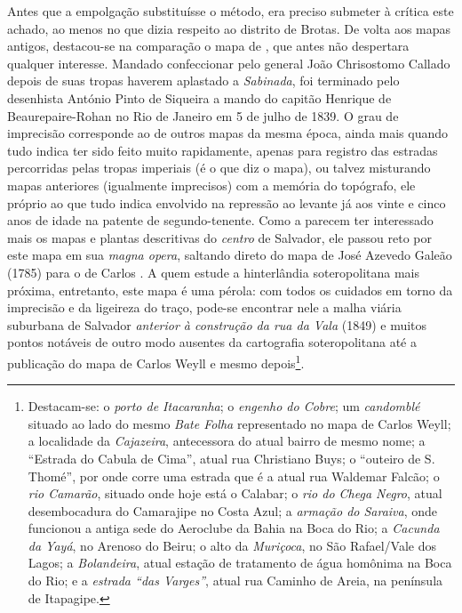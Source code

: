 Antes que a empolgação substituísse o método, era preciso submeter à crítica este achado, ao menos no que dizia respeito ao distrito de Brotas. De volta aos mapas antigos, destacou-se na comparação o mapa de , que antes não despertara qualquer interesse. Mandado confeccionar pelo general João Chrisostomo Callado depois de suas tropas haverem aplastado a \textit{Sabinada}, foi terminado pelo desenhista António Pinto de Siqueira a mando do capitão Henrique de Beaurepaire-Rohan no Rio de Janeiro em 5 de julho de 1839. O grau de imprecisão corresponde ao de outros mapas da mesma época, ainda mais quando tudo indica ter sido feito muito rapidamente, apenas para registro das estradas percorridas pelas tropas imperiais (é o que diz o mapa), ou talvez misturando mapas anteriores (igualmente imprecisos) com a memória do topógrafo, ele próprio ao que tudo indica envolvido na repressão ao levante já aos vinte e cinco anos de idade na patente de segundo-tenente. Como a  parecem ter interessado mais os mapas e plantas descritivas do \textit{centro} de Salvador, ele passou reto por este mapa em sua \textit{magna opera}, saltando direto do mapa de José Azevedo Galeão (1785) para o de Carlos . A quem estude a hinterlândia soteropolitana mais próxima, entretanto, este mapa é uma pérola: com todos os cuidados em torno da imprecisão e da ligeireza do traço, pode-se encontrar nele a malha viária suburbana de Salvador \textit{anterior à construção da rua da Vala} (1849) e muitos pontos notáveis de outro modo ausentes da cartografia soteropolitana até a publicação do mapa de Carlos Weyll e mesmo depois\footnote{Destacam-se: o \textit{porto de Itacaranha}; o \textit{engenho do Cobre}; um \textit{candomblé} situado ao lado do mesmo \textit{Bate Folha} representado no mapa de Carlos Weyll; a localidade da \textit{Cajazeira}, antecessora do atual bairro de mesmo nome; a ``Estrada do Cabula de Cima'', atual rua Christiano Buys; o ``outeiro de S. Thomé'', por onde corre uma estrada que é a atual rua Waldemar Falcão; o \textit{rio Camarão}, situado onde hoje está o Calabar; o \textit{rio do Chega Negro}, atual desembocadura do Camarajipe no Costa Azul; a \textit{armação do Saraiva}, onde funcionou a antiga sede do Aeroclube da Bahia na Boca do Rio; a \textit{Cacunda da Yayá}, no Arenoso do Beiru; o alto da \textit{Muriçoca}, no São Rafael/Vale dos Lagos; a \textit{Bolandeira}, atual estação de tratamento de água homônima na Boca do Rio; e a \textit{estrada ``das Varges''}, atual rua Caminho de Areia, na península de Itapagipe.}. 

